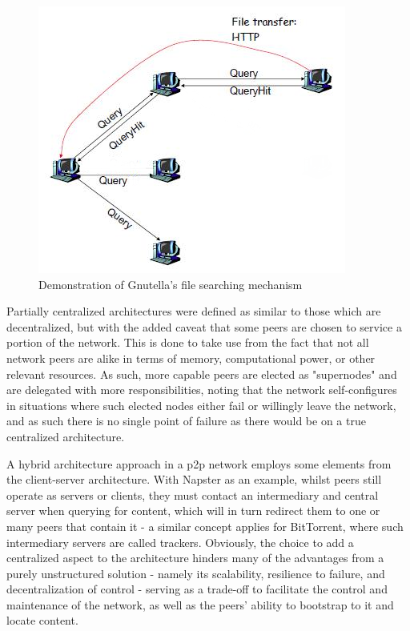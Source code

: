 \begin{figure}[!h]
\centering
\includegraphics[scale=1.5]{img/gnutella-flood.png}
\caption{Demonstration of Gnutella's file searching mechanism \cite{gnutella-flood}}
\label{fig:gnutella-flood}
\end{figure}

    Partially centralized architectures were defined as similar to those which are decentralized, but with the added caveat that some peers are chosen to service a portion of the network.
    This is done to take use from the fact that not all network peers are alike in terms of memory, computational power, or other relevant resources.
    As such, more capable peers are elected as "supernodes" and are delegated with more responsibilities, noting that the network self-configures in situations where such elected nodes either fail or willingly leave the network, and as such there is no single point of failure as there would be on a true centralized architecture.

    A hybrid architecture approach in a \gls{p2p} network employs some elements from the client-server architecture.
    With Napster \cite{napster} as an example, whilst peers still operate as servers or clients, they must contact an intermediary and central server when querying for content, which will in turn redirect them to one or many peers that contain it - a similar concept applies for BitTorrent, where such intermediary servers are called trackers.
    Obviously, the choice to add a centralized aspect to the architecture hinders many of the advantages from a purely unstructured solution - namely its scalability, resilience to failure, and decentralization of control - serving as a trade-off to facilitate the control and maintenance of the network, as well as the peers' ability to bootstrap to it and locate content.

